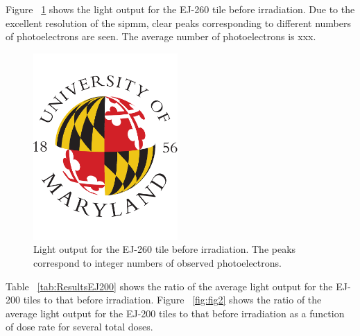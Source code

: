 \documentclass[review]{elsarticle}
\begin{document}
Figure ~\ref{fig:fig1} shows the light output for the EJ-260 tile before irradiation.  Due to the excellent resolution of the sipmm, clear peaks corresponding to different numbers of photoelectrons are seen.  The average number of photoelectrons is xxx.

\begin{figure}[!ht]
\begin{center}
\includegraphics[width=0.49\textwidth]{./figures/placeholder.pdf}
\caption{
Light output for the EJ-260 tile before irradiation.  The peaks correspond to integer numbers
of observed photoelectrons.
}
\label{fig:fig1}
\end{center}
\end{figure}

Table ~\ref{tab:ResultsEJ200} shows the ratio of the average light output
for the EJ-200 tiles to that before irradiation.
Figure ~\ref{fig:fig2} shows the ratio of the average light output
for the EJ-200 tiles to that before irradiation as a function of dose rate
for several total doses.
\end{document}
